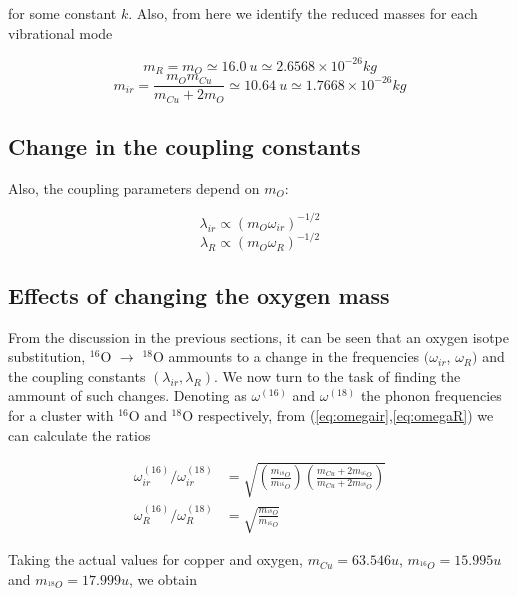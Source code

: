 \noindent for some constant $k$.
Also, from here we identify the reduced masses for each vibrational mode

\begin{equation}\label{eq:redMassR}
m_R = m_O \simeq 16.0\ u \simeq 2.6568 \times 10^{-26} kg
\end{equation}
\begin{equation}\label{eq:redMassIr}
m_{ir}=\frac{m_Om_{Cu}}{m_{Cu}+2m_O} \simeq 10.64\ u \simeq 1.7668 \times 10^{-26}kg
\end{equation}

\subsection{Change in the coupling constants}

Also, the coupling parameters depend on $m_O$\cite{?}:

\begin{equation}\label{eq:ir-coupl-isot}
\lambda_{ir}\propto (m_O\omega_{ir})^{-1/2}
\end{equation}
\begin{equation}\label{eq:Ram-coupl-isot}
\lambda_R\propto (m_O\omega_{R})^{-1/2}
\end{equation}


\subsection{Effects of changing the oxygen mass}

From the discussion in the previous sections, it can be seen that an oxygen isotpe substitution, $^{16}$O $\rightarrow$ $^{18}$O ammounts to a change in the frequencies  $(\omega_{ir}$, $\omega_R)$ and the coupling constants $(\lambda_{ir},\lambda_R)$.
We now turn to the task of finding the ammount of such changes.
Denoting as $\omega^{(16)}$ and $\omega^{(18)}$ the phonon frequencies for a cluster with $^{16}$O and $^{18}$O respectively, from (\ref{eq:omegair},\ref{eq:omegaR}) we can calculate the ratios

\begin{align}
\omega^{(16)}_{ir}/\omega^{(18)}_{ir}
 & =\sqrt{\left(\frac{m_{^{18}O}}{m_{^{16}O}}\right)\left(\frac{m_{Cu}+2m_{^{16}O}}{m_{Cu}+2m_{^{18}O}}\right)} \\
\omega^{(16)}_{R}/\omega^{(18)}_{R}
 & =\sqrt{\frac{m_{^{18}O}}{m_{^{16}O}}}
\end{align}

Taking the actual values for copper and oxygen, $m_{Cu}=63.546u$, $m_{^{16}O}=15.995u$ and $m_{^{18}O}=17.999u$, we obtain

